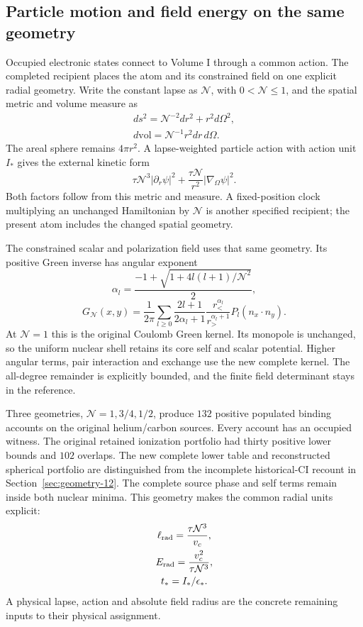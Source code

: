 
\subsection{Particle motion and field energy on the same geometry}

Occupied electronic states connect to Volume I through a common action. The completed recipient places the atom and its constrained field on one explicit radial geometry. Write the constant lapse as $\mathcal N$, with $0<\mathcal N\leq1$, and the spatial metric and volume measure as
\[
\begin{gathered}
ds^2=\mathcal N^{-2}dr^2+r^2d\Omega^2,
 \\
 d\mathrm{vol}=\mathcal N^{-1}r^2dr\,d\Omega.
\end{gathered}
\]
The areal sphere remains $4\pi r^2$. A lapse-weighted particle action with action unit $I_*$ gives the external kinetic form
\[
 \tau\mathcal N^3|\partial_r\psi|^2
       +\frac{\tau\mathcal N}{r^2}|\nabla_\Omega\psi|^2.
\]
Both factors follow from this metric and measure. A fixed-position clock multiplying an unchanged Hamiltonian by $\mathcal N$ is another specified recipient; the present atom includes the changed spatial geometry. 

The constrained scalar and polarization field uses that same geometry. Its positive Green inverse has angular exponent
\[
 \alpha_l=\frac{-1+\sqrt{1+4l(l+1)/\mathcal N^2}}2,
\]
\[
 G_{\mathcal N}(x,y)=\frac1{2\pi}
  \sum_{l\geq0}\frac{2l+1}{2\alpha_l+1}
  \frac{r_<^{\alpha_l}}{r_>^{\alpha_l+1}}P_l(n_x\cdot n_y).
\]
At $\mathcal N=1$ this is the original Coulomb Green kernel. Its monopole is unchanged, so the uniform nuclear shell retains its core self and scalar potential. Higher angular terms, pair interaction and exchange use the new complete kernel. The all-degree remainder is explicitly bounded, and the finite field determinant stays in the reference.

Three geometries, $\mathcal N=1,3/4,1/2$, produce $132$ positive populated binding accounts on the original helium/carbon sources. Every account has an occupied witness. The original retained ionization portfolio had thirty positive lower bounds and $102$ overlaps. The new complete lower table and reconstructed spherical portfolio are distinguished from the incomplete historical-CI recount in Section~\ref{sec:geometry-12}. The complete source phase and self terms remain inside both nuclear minima. This geometry makes the common radial units explicit:
\[
\begin{gathered}
\ell_{\rm rad}=\frac{\tau\mathcal N^3}{v_c},\\
 E_{\rm rad}=\frac{v_c^2}{\tau\mathcal N^3},\\
 t_*=I_*/\epsilon_*.
\end{gathered}
\]
A physical lapse, action and absolute field radius are the concrete remaining inputs to their physical assignment.

